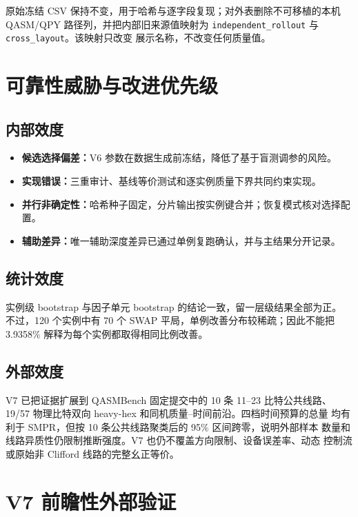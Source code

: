 \documentclass[11pt,a4paper]{article}
\begin{document}
原始冻结 CSV 保持不变，用于哈希与逐字段复现；对外表删除不可移植的本机
QASM/QPY 路径列，并把内部旧来源值映射为
\texttt{independent\_rollout} 与 \texttt{cross\_layout}。该映射只改变
展示名称，不改变任何质量值。

\section{可靠性威胁与改进优先级}

\subsection{内部效度}

\begin{itemize}
  \item \textbf{候选选择偏差：}V6 参数在数据生成前冻结，降低了基于盲测调参的风险。
  \item \textbf{实现错误：}三重审计、基线等价测试和逐实例质量下界共同约束实现。
  \item \textbf{并行非确定性：}哈希种子固定，分片输出按实例键合并；恢复模式核对选择配置。
  \item \textbf{辅助差异：}唯一辅助深度差异已通过单例复跑确认，并与主结果分开记录。
\end{itemize}

\subsection{统计效度}

实例级 bootstrap 与因子单元 bootstrap 的结论一致，留一层级结果全部为正。
不过，120 个实例中有 70 个 SWAP 平局，单例改善分布较稀疏；因此不能把
3.9358\% 解释为每个实例都取得相同比例改善。

\subsection{外部效度}

V7 已把证据扩展到 QASMBench 固定提交中的 10 条 11--23 比特公共线路、
19/57 物理比特双向 heavy-hex 和同机质量--时间前沿。四档时间预算的总量
均有利于 SMPR，但按 10 条公共线路聚类后的 95\% 区间跨零，说明外部样本
数量和线路异质性仍限制推断强度。V7 也仍不覆盖方向限制、设备误差率、动态
控制流或原始非 Clifford 线路的完整幺正等价。

\section{V7 前瞻性外部验证}
\end{document}
